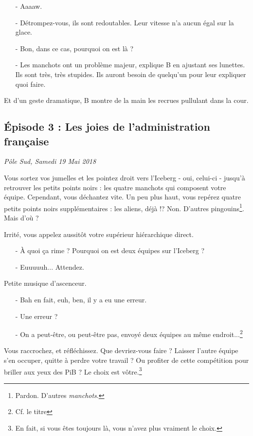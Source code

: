 \begin{itemize}
    \item[-] Aaaaw.
    \item[-] Détrompez-vous, ils sont redoutables. Leur vitesse n'a aucun égal
        sur la glace.
    \item[-] Bon, dans ce cas, pourquoi on est là ?
    \item[-] Les manchots ont un problème majeur, explique B en ajustant ses
        lunettes. Ils sont très, très stupides. Ils auront besoin de quelqu'un
        pour leur expliquer quoi faire.
\end{itemize}

Et d'un geste dramatique, B montre de la main les recrues pullulant dans la
cour.

\subsection{Épisode 3 : Les joies de l'administration française}
\hfill \textit{Pôle Sud, Samedi 19 Mai 2018}

Vous sortez vos jumelles et les pointez droit vers l'Iceberg - oui, celui-ci -
jusqu'à retrouver les petits points noirs : les quatre manchots qui composent
votre équipe.
Cependant, vous déchantez vite. Un peu plus haut, vous repérez quatre petits
points noirs supplémentaires : les aliens, déjà !? Non. D'autres
pingouins\footnote{Pardon. D'autres \emph{manchots}.}. Mais d'où ?

Irrité, vous appelez aussitôt votre supérieur hiérarchique direct.

\begin{itemize}
    \item[-] À quoi ça rime ? Pourquoi on est deux équipes sur l'Iceberg ?
    \item[-] Euuuuuh... Attendez.
\end{itemize}

Petite musique d'ascenceur.

\begin{itemize}
    \item[-] Bah en fait, euh, ben, il y a eu une erreur.
    \item[-] Une erreur ?
    \item[-] On a peut-être, ou peut-être pas, envoyé deux équipes au même
        endroit...\footnote{Cf. le titre}
\end{itemize}

Vous raccrochez, et réfléchissez. Que devriez-vous faire ? Laisser l'autre
équipe s'en occuper, quitte à perdre votre travail ? Ou profiter de cette
compétition pour briller aux yeux des PiB ? Le choix est vôtre.\footnote{En
fait, si vous êtes toujours là, vous n'avez plus vraiment le choix.}
